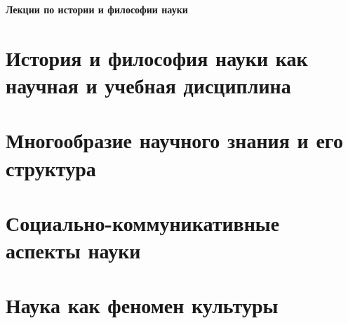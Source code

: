 \documentclass[a4paper, 12pt, notitlepage]{report}
\begin{document}
\begin{titlepage}
    \centering
    \vspace*{9cm}
    {\Huge \textbf{Лекции по истории и философии науки}}
    \vfill
\end{titlepage}

\tableofcontents

\chapter{История и философия науки как научная и учебная дисциплина}


\chapter{Многообразие научного знания и его структура}


\chapter{Социально-коммуникативные аспекты науки}


\chapter{Наука как феномен культуры}


%
\end{document}

